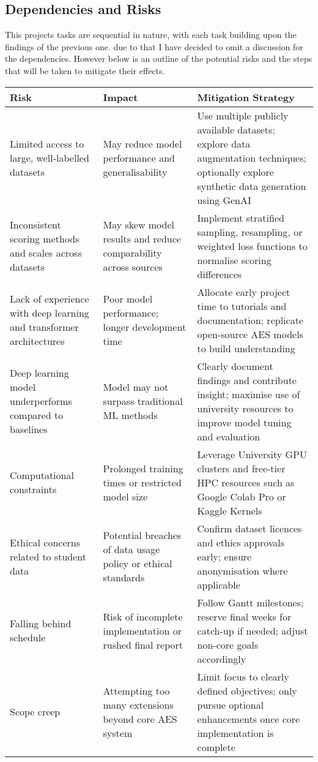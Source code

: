 \documentclass[11pt]{article}
\begin{document}
\subsection*{Dependencies and Risks}

This projects tasks are sequential in nature, with each task building upon the findings of the previous one. due to that I have decided to omit a discussion for the dependencies. However 
below is an outline of the potential risks and the steps that will be taken to mitigate their effects.


\begin{center}
    \renewcommand{\arraystretch}{1.4}
    \begin{tabular}{|p{4.5cm}|p{6cm}|p{4.5cm}|}
        \hline
        \textbf{Risk} & \textbf{Impact} & \textbf{Mitigation Strategy} \\
        \hline
        Limited access to large, well-labelled datasets & May reduce model performance and generalisability & Use multiple publicly available datasets; explore data augmentation techniques; optionally 
        explore synthetic data generation using GenAI \\
        \hline
        Inconsistent scoring methods and scales across datasets & May skew model results and reduce comparability across sources & Implement stratified sampling, resampling, or weighted loss functions 
        to normalise scoring differences \\
        \hline
        Lack of experience with deep learning and transformer architectures & Poor model performance; longer development time & Allocate early project time to tutorials and documentation; replicate 
        open-source AES models to build understanding \\
        \hline
        Deep learning model underperforms compared to baselines & Model may not surpass traditional ML methods & Clearly document findings and contribute insight; maximise use of university resources 
        to improve model tuning and evaluation \\
        \hline
        Computational constraints & Prolonged training times or restricted model size & Leverage University GPU clusters and free-tier HPC resources such as Google Colab Pro or Kaggle Kernels \\
        \hline
        Ethical concerns related to student data & Potential breaches of data usage policy or ethical standards & Confirm dataset licences and ethics approvals early; ensure anonymisation where applicable \\
        \hline
        Falling behind schedule & Risk of incomplete implementation or rushed final report & Follow Gantt milestones; reserve final weeks for catch-up if needed; adjust non-core goals accordingly \\
        \hline
        Scope creep & Attempting too many extensions beyond core AES system & Limit focus to clearly defined objectives; only pursue optional enhancements once core implementation is complete \\
        \hline
    \end{tabular}
    \end{center}
\end{document}
